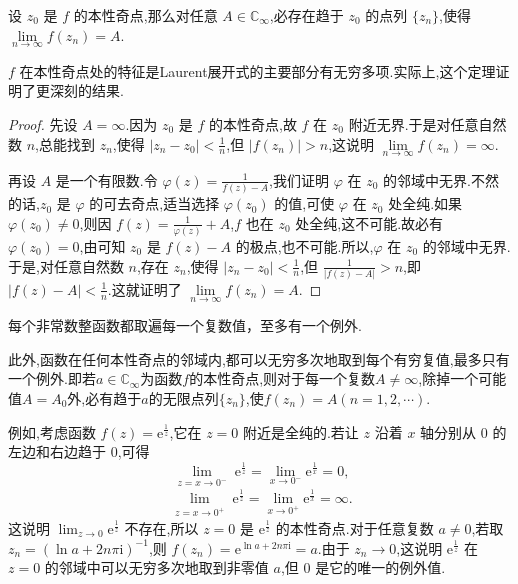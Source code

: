 \documentclass[../../main.tex]{subfiles}%
\begin{document}
\begin{theorem}[Weierstrass定理]\label{theorem:Weierstrass-定理5.2.5}
设 \( z_0 \) 是 \( f \) 的本性奇点,那么对任意 \( A \in \mathbb{C}_{\infty} \),必存在趋于 \( z_0 \) 的点列 \( \{ z_n \} \),使得 \( \lim\limits_{n \to \infty} f(z_n) = A \).
\end{theorem}
\begin{remark}
\( f \) 在本性奇点处的特征是Laurent展开式的主要部分有无穷多项.实际上,这个定理证明了更深刻的结果.
\end{remark}
\begin{proof}

先设 \( A = \infty \).因为 \( z_0 \) 是 \( f \) 的本性奇点,故 \( f \) 在 \( z_0 \) 附近无界.于是对任意自然数 \( n \),总能找到 \( z_n \),使得 \( |z_n - z_0| < \frac{1}{n} \),但 \( |f(z_n)| > n \),这说明 \( \lim\limits_{n \to \infty} f(z_n) = \infty \).

再设 \( A \) 是一个有限数.令 \( \varphi(z) = \frac{1}{f(z) - A} \),我们证明 \( \varphi \) 在 \( z_0 \) 的邻域中无界.不然的话,\( z_0 \) 是 \( \varphi \) 的可去奇点,适当选择 \( \varphi(z_0) \) 的值,可使 \( \varphi \) 在 \( z_0 \) 处全纯.如果 \( \varphi(z_0) \neq 0 \),则因 \( f(z) = \frac{1}{\varphi(z)} + A \),\( f \) 也在 \( z_0 \) 处全纯,这不可能.故必有 \( \varphi(z_0) = 0 \),由可知 \( z_0 \) 是 \( f(z) -A\) 的极点,也不可能.所以,\( \varphi \) 在 \( z_0 \) 的邻域中无界.于是,对任意自然数 \( n \),存在 \( z_n \),使得 \( |z_n - z_0| < \frac{1}{n} \),但 \( \frac{1}{|f(z) - A|} > n \),即 \( |f(z) - A| < \frac{1}{n} \).这就证明了 \( \lim\limits_{n \to \infty} f(z_n) = A \).
\end{proof}

\begin{theorem}[Picard定理]\label{ theorem:Picard定理-定理5.2.6}
每个非常数整函数都取遍每一个复数值，至多有一个例外.

此外,函数在任何本性奇点的邻域内,都可以无穷多次地取到每个有穷复值,最多只有一个例外.即若$a\in \mathbb{C}_{\infty}$为函数$f$的本性奇点,则对于每一个复数$A\neq \infty$,除掉一个可能值$A=A_0$外,必有趋于$a$的无限点列$\{z_n\}$,使$f(z_n)=A(n=1,2,\cdots)$.
\end{theorem}
\begin{remark}
例如,考虑函数 \( f(z) = \mathrm{e}^{\frac{1}{z}} \),它在 \( z = 0 \) 附近是全纯的.若让 \( z \) 沿着 \( x \) 轴分别从 \( 0 \) 的左边和右边趋于 \( 0 \),可得
\[
\lim_{\substack{z = x \to 0^-}} \mathrm{e}^{\frac{1}{z}} = \lim_{x \to 0^-} \mathrm{e}^{\frac{1}{x}} = 0,
\]
\[
\lim_{\substack{z = x \to 0^+}} \mathrm{e}^{\frac{1}{z}} = \lim_{x \to 0^+} \mathrm{e}^{\frac{1}{x}} = \infty.
\]
这说明 \( \lim_{z \to 0} \mathrm{e}^{\frac{1}{z}} \) 不存在,所以 \( z = 0 \) 是 \( \mathrm{e}^{\frac{1}{z}} \) 的本性奇点.对于任意复数 \( a \neq 0 \),若取 \( z_n = (\ln a + 2n\pi \mathrm{i})^{-1} \),则 \( f(z_n) = \mathrm{e}^{\ln a + 2n\pi \mathrm{i}} = a \).由于 \( z_n \to 0 \),这说明 \( \mathrm{e}^{\frac{1}{z}} \) 在 \( z = 0 \) 的邻域中可以无穷多次地取到非零值 \( a \),但 \( 0 \) 是它的唯一的例外值.
\end{remark}
\end{document}
